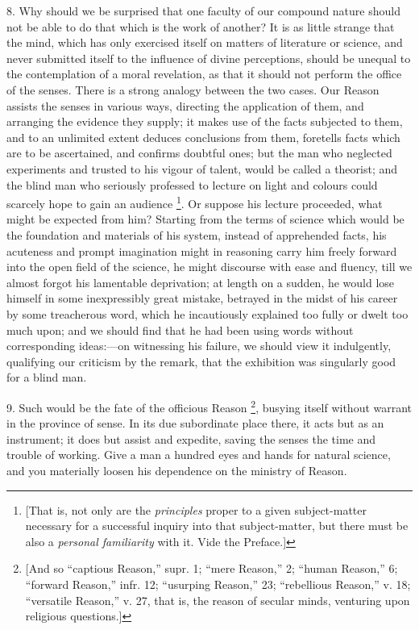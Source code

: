 8. Why should we be surprised that one faculty of our compound
nature should not be able to do that which is the work of another? It
is as little strange that the mind, which has only exercised itself on
matters of literature or science, and never submitted itself to the
influence of divine perceptions, should be unequal to the
contemplation of a moral revelation, as that it should not perform the
office of the senses. There is a strong analogy between the two cases.
Our Reason assists the senses in various ways, directing the
application of them, and arranging the evidence they supply; it makes
use of the facts subjected to them, and to an unlimited extent deduces
conclusions from them, foretells facts which are to be ascertained,
and confirms doubtful ones; but the man who neglected experiments and
trusted to his vigour of talent, would be called a theorist; and the
blind man who seriously professed to lecture on light and colours
could scarcely hope to gain an audience \footnote{[That is, not
only are the \emph{principles} proper to a given subject-matter
necessary for a successful inquiry into that subject-matter, but there
must be also a \emph{personal familiarity} with it. Vide the Preface.]}. Or suppose his lecture proceeded, what might be expected from
him? Starting from the terms of science which would be the foundation
and materials of his system, instead of apprehended facts, his
acuteness and prompt imagination might in reasoning carry him freely
forward into the open field of the science, he might discourse with
ease and fluency, till we almost forgot his lamentable deprivation; at
length on a sudden, he would lose himself in some inexpressibly great
mistake, betrayed in the midst of his career by some treacherous word,
which he incautiously explained too fully or dwelt too much upon; and
we should find that he had been using words without corresponding
ideas:—on witnessing his failure, we should view it indulgently,
qualifying our criticism by the remark, that the exhibition was
singularly good for a blind man.

9. Such would be the fate of the officious Reason \footnote{[And so
``captious Reason,'' supr. 1; ``mere Reason,'' 2;
``human Reason,'' 6; ``forward Reason,'' infr. 12;
``usurping Reason,'' 23; ``rebellious Reason,'' v. 18;
``versatile Reason,'' v. 27, that is, the reason of secular
minds, venturing upon religious questions.]}, busying itself without warrant in the province of sense. In
its due subordinate place there, it acts but as an instrument; it does
but assist and expedite, saving the senses the time and trouble of
working. Give a man a hundred eyes and hands for natural science, and
you materially loosen his dependence on the ministry of Reason.

